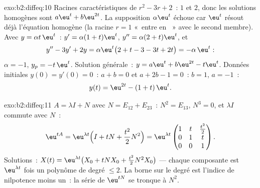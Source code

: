 \begin{solution}{exo:b2:diffeq:10}
Racines caractéristiques de $r^2 - 3r + 2$~: $1$ et $2$, donc les
solutions homogènes sont $a\eu^t + b\eu^{2t}$. La supposition
$\alpha\eu^t$ échoue car $\eu^t$ résout déjà l'équation homogène
(la racine $r = 1$ «~entre en ~» avec le second membre).
Avec $y = \alpha t\,\eu^t$~: $y' = \alpha(1 + t)\eu^t$, $y'' =
\alpha(2 + t)\eu^t$, et
\[
y'' - 3y' + 2y = \alpha\eu^t\bigl(2 + t - 3 - 3t + 2t\bigr)
= -\alpha\,\eu^t :
\]
$\alpha = -1$, $y_p = -t\,\eu^t$. Solution générale~: $y = a\eu^t
+ b\eu^{2t} - t\eu^t$. Données initiales $y(0) = y'(0) = 0$~: $a + b
= 0$ et $a + 2b - 1 = 0$~: $b = 1$, $a = -1$~:
\[
y(t) = \eu^{2t} - (1 + t)\,\eu^{t} .
\]

\end{solution}

\begin{solution}{exo:b2:diffeq:11}
$A = \lambda I + N$ avec $N = E_{12} + E_{23}$~: $N^2 = E_{13}$,
$N^3 = 0$, et $\lambda I$ commute avec $N$~:
\[
\eu^{tA} = \eu^{\lambda t}\Bigl(I + tN +
\frac{t^2}{2}N^2\Bigr)
= \eu^{\lambda t}\begin{pmatrix}
1 & t & \frac{t^2}{2}\\
0 & 1 & t\\
0 & 0 & 1
\end{pmatrix}.
\]
Solutions~: $X(t) = \eu^{\lambda t}\bigl(X_0 + tNX_0 +
\frac{t^2}2N^2X_0\bigr)$ --- chaque composante est $\eu^{\lambda
t}$ fois un polynôme de degré $\leq 2$. La borne sur le degré est
l'indice de nilpotence moins un~: la série de $\eu^{tN}$ se tronque
à $N^2$.
\end{solution}

